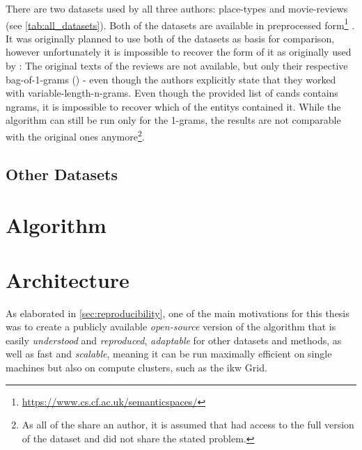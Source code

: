 There are two datasets used by all three authors: place-types and movie-reviews (see \autoref{tab:all_datasets}). Both of the datasets are available in preprocessed form\footnote{\url{https://www.cs.cf.ac.uk/semanticspaces/}} \cite{Derrac2015}. It was originally planned to use both of the datasets as basis for comparison, however unfortunately it is impossible to recover the form of it as originally used by \textcite{Derrac2015}: The original texts of the reviews are not available, but only their respective bag-of-1-grams () - even though the authors explicitly state that they worked with variable-length-n-grams. Even though the provided list of \glspl{cand} contains \glspl{ngram}, it is impossible to recover which of the \glspl{entity} contained it. While the algorithm can still be run only for the 1-grams, the results are not comparable with the original ones anymore\footnote{As all of the \mainalgos share an author, it is assumed that \cite{Alshaikh2020,Ager2018} had access to the full version of the dataset and did not share the stated problem.}.


\subsection{Other Datasets}



\section{Algorithm}




\section{Architecture}
\label{sec:architecture}

As elaborated in \autoref{sec:reproducibility}, one of the main motivations for this thesis was to create a publicly available \textit{open-source} version of the algorithm that is easily \textit{understood} and \textit{reproduced}, \textit{adaptable} for other datasets and methods, as well as fast and \textit{scalable}, meaning it can be run maximally efficient on single machines but also on compute clusters, such as the \acrshort{ikw} Grid.

